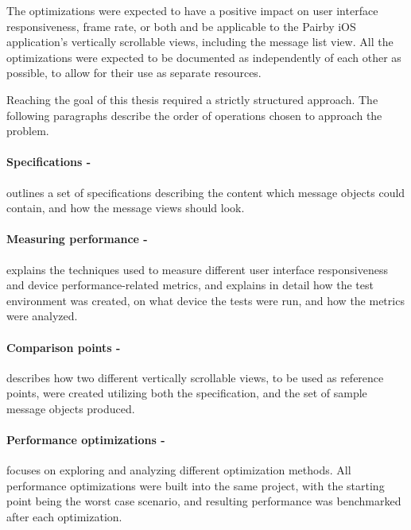 \documentclass[a4paper,12pt]{article}
\begin{document}
The optimizations were expected to have a positive impact on user interface responsiveness, frame rate, or both and be applicable to the Pairby iOS application's vertically scrollable views, including the message list view. All the optimizations were expected to be documented as independently of each other as possible, to allow for their use as separate resources.

Reaching the goal of this thesis required a strictly structured approach. The following paragraphs describe the order of operations chosen to approach the problem.

\paragraph*{Specifications -}\hspace{-1em}
outlines a set of specifications describing the content which message objects could contain, and how the message views should look.

\paragraph*{Measuring performance -}\hspace{-1em}
explains the techniques used to measure different user interface responsiveness and device performance-related metrics, and explains in detail how the test environment was created, on what device the tests were run, and how the metrics were analyzed.

\paragraph*{Comparison points -}\hspace{-1em}
describes how two different vertically scrollable views, to be used as reference points, were created utilizing both the specification, and the set of sample message objects produced.

\paragraph*{Performance optimizations -}\hspace{-1em}
focuses on exploring and analyzing different optimization methods. All performance optimizations were built into the same project, with the starting point being the worst case scenario, and resulting performance was benchmarked after each optimization.
\end{document}
